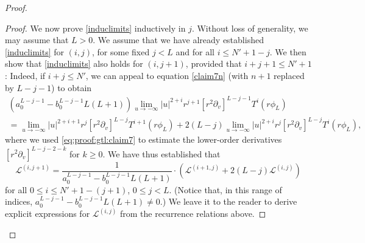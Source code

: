 \documentclass[11pt,english]{article}
\numberwithin{equation}{section}
\theoremstyle{remark}
\theoremstyle{plain}
\theoremstyle{remark}
\newcommand{\pv}{\partial_v}
\renewcommand{\(}{\left(}
\renewcommand{\)}{\right)}
\begin{document}
\begin{proof}
\begin{proof}
We now prove \eqref{induclimits} inductively in $j$. Without loss of generality, we may assume that $L>0$.
We assume that we have already established \eqref{induclimits} for $(i,j)$, for some fixed $j<L$ and for all $i\leq N'+1-j$. 
We then show that \eqref{induclimits} also holds for $(i,j+1)$, provided that $i+j+1\leq N'+1$: 
Indeed, if $i+j\leq N'$, we can appeal to equation \eqref{claim7n} (with $n+1$ replaced by $L-j-1$) to obtain
\begin{multline}
(a_0^{L-j-1}-b_0^{L-j-1}L(L+1))\lim_{u\to-\infty}|u|^{2+i}r^{j+1}[r^2\pv]^{L-j-1}T^i(r\phi_L)\\
=\lim_{u\to-\infty}|u|^{2+i+1}r^j[r^2\pv]^{L-j}T^{i+1}(r\phi_L)+2(L-j)\lim_{u\to-\infty}|u|^{2+i}r^j[r^2\pv]^{L-j}T^i(r\phi_L),
\end{multline}
where we used \eqref{eq:proof:gtl:claim7} to estimate the lower-order derivatives $[r^2\pv]^{L-j-2-k}$ for $k\geq 0$. We have thus established that
\begin{equation}
\mathcal{L}^{(i,j+1)}=\frac{1}{a_0^{L-j-1}-b_0^{L-j-1}L(L+1)}\cdot\left(\mathcal{L}^{(i+1,j)}+2(L-j)\mathcal{L}^{(i,j)}\right)
\end{equation}
for all $0\leq i\leq N'+1-(j+1)$, $0\leq j<L$. (Notice that, in this range of indices,  $a_0^{L-j-1}-b_0^{L-j-1}L(L+1)\neq 0$.) 
We leave it to the reader to derive explicit expressions for $\mathcal{L}^{(i,j)}$ from the recurrence relations above. 
\end{proof}


\end{proof}
\end{document}
